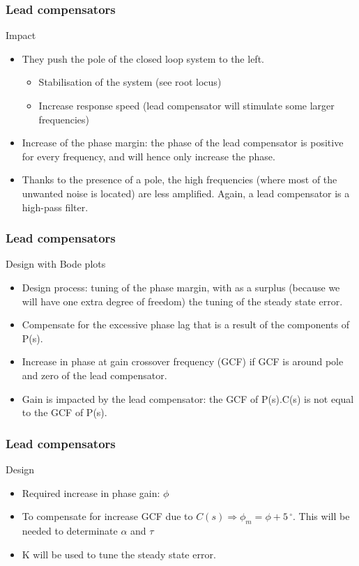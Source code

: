 \begin{frame}
\frametitle{Lead compensators}
\begin{block}{Impact}
	\begin{itemize}
	\item They push the pole of the closed loop system to the left.
	\begin{itemize}
	\item Stabilisation of the system (see root locus)
	\item Increase response speed (lead compensator will stimulate some larger frequencies)
	\end{itemize}
	\item Increase of the phase margin: the phase of the lead compensator is positive for every frequency, and will hence only increase the phase.
	\item Thanks to the presence of a pole, the high frequencies (where most of the unwanted noise is located) are less amplified. Again, a lead compensator is a high-pass filter.
	
	\end{itemize}
\end{block}
\end{frame}

\begin{frame}
\frametitle{Lead compensators}
\begin{block}{Design with Bode plots}
	\begin{itemize}
		\item Design process: tuning of the phase margin, with as a surplus (because we will have one extra degree of freedom) the tuning of the steady state error.
		\item Compensate for the excessive phase lag that is a result of the components of P(s).
		\item Increase in phase at gain crossover frequency (GCF) if GCF is around pole and zero of the lead compensator.
		\item Gain is impacted by the lead compensator: the GCF of P(s).C(s) is not equal to the GCF of P(s).
	\end{itemize}		
\end{block}
\end{frame}

\begin{frame}
	\frametitle{Lead compensators}
	\begin{block}{Design}
		\begin{itemize}
			\item Required increase in phase gain: $\phi$
			\item To compensate for increase GCF due to 
			$C(s) \Rightarrow \phi_m = \phi + 5\,^{\circ}$. This will be needed to determinate $\alpha$ and $\tau$
			\item K will be used to tune the steady state error.
		\end{itemize}		
	\end{block}
\end{frame}


